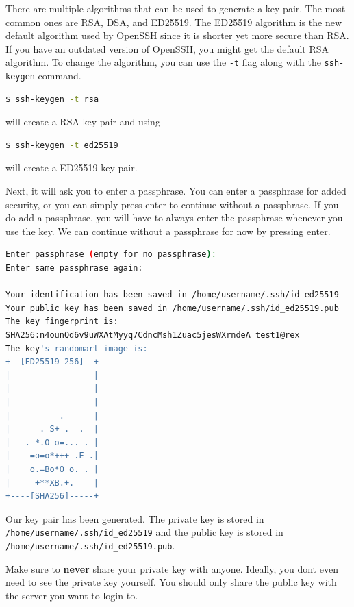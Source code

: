 \begin{remark}
  There are multiple algorithms that can be used
  to generate a key pair. The most common ones are
  RSA, DSA, and ED25519. The ED25519 algorithm is
  the new default algorithm used by OpenSSH since
  it is shorter yet more secure than RSA.
  If you have an outdated version of OpenSSH, you
  might get the default RSA algorithm.
  To change the algorithm, you can use the \lstinline|-t|
  flag along with the \lstinline|ssh-keygen| command.
  \begin{lstlisting}[language=bash]
  $ ssh-keygen -t rsa \end{lstlisting}
  will create a RSA key pair and using
  \begin{lstlisting}[language=bash]
  $ ssh-keygen -t ed25519 \end{lstlisting}
  will create a ED25519 key pair.
\end{remark}

Next, it will ask you to enter a passphrase.
You can enter a passphrase for added security,
or you can simply press enter to continue without
a passphrase. If you do add a passphrase, you will
have to always enter the passphrase whenever you
use the key. We can continue without a passphrase
for now by pressing enter.

\begin{lstlisting}[language=bash, basicstyle=\footnotesize\ttfamily]
Enter passphrase (empty for no passphrase):
Enter same passphrase again:

Your identification has been saved in /home/username/.ssh/id_ed25519
Your public key has been saved in /home/username/.ssh/id_ed25519.pub
The key fingerprint is:
SHA256:n4ounQd6v9uWXAtMyyq7CdncMsh1Zuac5jesWXrndeA test1@rex
The key's randomart image is:
+--[ED25519 256]--+
|                 |
|                 |
|                 |
|          .      |
|      . S+ .  .  |
|   . *.O o=... . |
|    =o=o*+++ .E .|
|    o.=Bo*O o. . |
|     +**XB.+.    |
+----[SHA256]-----+
\end{lstlisting}

Our key pair has been generated. The private key
is stored in \lstinline|/home/username/.ssh/id_ed25519|
and the public key is stored in
\lstinline|/home/username/.ssh/id_ed25519.pub|.

Make sure to \textbf{never} share your private key with anyone.
Ideally, you dont even need to see the private key yourself.
You should only share the public key with the server
you want to login to.

